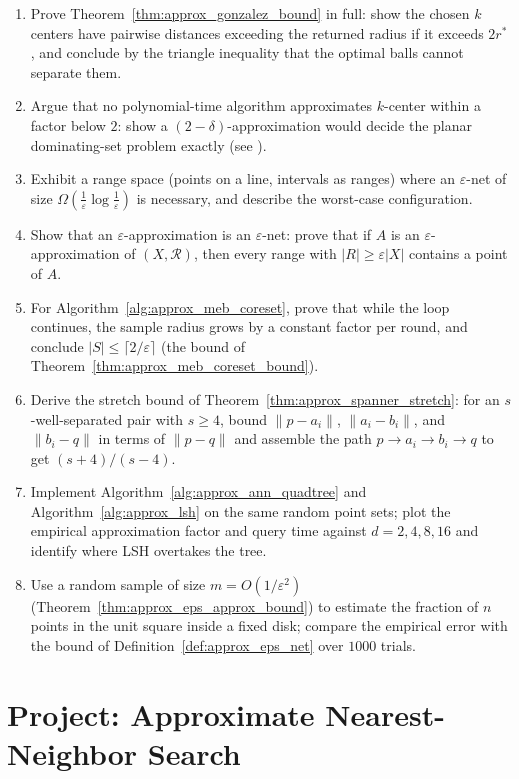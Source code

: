 \begin{enumerate}
  \item Prove Theorem~\ref{thm:approx_gonzalez_bound} in full: show the
    chosen $k$ centers have pairwise distances exceeding the returned radius
    if it exceeds $2 r^*$, and conclude by the triangle inequality that the
    optimal balls cannot separate them.
  \item Argue that no polynomial-time algorithm approximates $k$-center
    within a factor below $2$: show a $(2 - \delta)$-approximation would
    decide the planar dominating-set problem exactly (see \cite{gonzalez1985}).
  \item Exhibit a range space (points on a line, intervals as ranges) where
    an $\varepsilon$-net of size $\Omega(\frac{1}{\varepsilon}
    \log\frac{1}{\varepsilon})$ is necessary, and describe the worst-case
    configuration.
  \item Show that an $\varepsilon$-approximation is an $\varepsilon$-net:
    prove that if $A$ is an $\varepsilon$-approximation of $(X,
    \mathcal{R})$, then every range with $|R| \geq \varepsilon |X|$ contains
    a point of $A$.
  \item For Algorithm~\ref{alg:approx_meb_coreset}, prove that while the
    loop continues, the sample radius grows by a constant factor per round,
    and conclude $|S| \leq \lceil 2/\varepsilon \rceil$ (the bound of
    Theorem~\ref{thm:approx_meb_coreset_bound}).
  \item Derive the stretch bound of
    Theorem~\ref{thm:approx_spanner_stretch}: for an $s$-well-separated pair
    with $s \geq 4$, bound $\|p - a_i\|$, $\|a_i - b_i\|$, and
    $\|b_i - q\|$ in terms of $\|p - q\|$ and assemble the path
    $p \to a_i \to b_i \to q$ to get $(s + 4)/(s - 4)$.
  \item Implement Algorithm~\ref{alg:approx_ann_quadtree} and
    Algorithm~\ref{alg:approx_lsh} on the same random point sets; plot the
    empirical approximation factor and query time against $d = 2, 4, 8, 16$
    and identify where LSH overtakes the tree.
  \item Use a random sample of size $m = O(1/\varepsilon^2)$
    (Theorem~\ref{thm:approx_eps_approx_bound}) to estimate the fraction of
    $n$ points in the unit square inside a fixed disk; compare the empirical
    error with the bound of Definition~\ref{def:approx_eps_net} over $1000$
    trials.
\end{enumerate}

\section{Project: Approximate Nearest-Neighbor Search}
\label{sec:approx_project}

